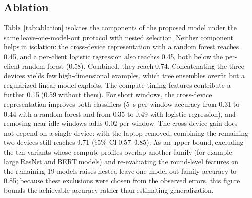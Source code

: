 \subsection{Ablation}
\label{subsec:ablation}
Table~\ref{tab:ablation} isolates the components of the proposed model under the
same leave-one-model-out protocol with nested selection. Neither component helps
in isolation: the cross-device representation with a random forest reaches 0.45,
and a per-client logistic regression also reaches 0.45, both below the per-client
random forest (0.58). Combined, they reach 0.74. Concatenating the three devices
yields few high-dimensional examples, which tree ensembles overfit but a
regularized linear model exploits. The compute-timing features contribute a
further 0.15 (0.59 without them). For short windows, the cross-device
representation improves both classifiers (5~s per-window accuracy from 0.31 to
0.44 with a random forest and from 0.35 to 0.49 with logistic regression), and
removing near-idle windows adds 0.02 per window. The cross-device gain does not
depend on a single device: with the laptop removed, combining the remaining two
devices still reaches 0.71 (95\% CI 0.57--0.85). As an upper bound, excluding
the ten variants whose compute profiles overlap another family (for example,
large ResNet and BERT models) and re-evaluating the round-level features on the
remaining 19 models raises nested leave-one-model-out family accuracy to 0.85;
because these exclusions were chosen from the observed errors, this figure bounds
the achievable accuracy rather than estimating generalization.


